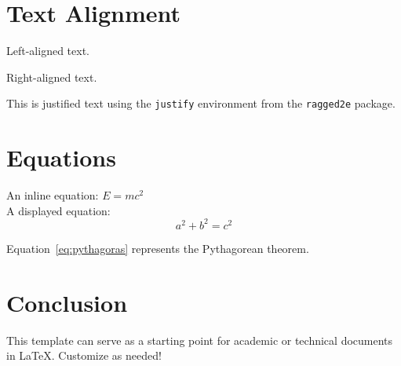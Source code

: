 \documentclass[12pt]{article} %
\begin{document}
\section{Text Alignment}
\begin{flushleft}
Left-aligned text.
\end{flushleft}

\begin{flushright}
Right-aligned text.
\end{flushright}

\begin{justify}
This is justified text using the \texttt{justify} environment from the \texttt{ragged2e} package.
\end{justify}

\section{Equations}
An inline equation: $E = mc^2$ \\
A displayed equation:
\begin{equation}
    a^2 + b^2 = c^2
    \label{eq:pythagoras}
\end{equation}

Equation~\ref{eq:pythagoras} represents the Pythagorean theorem.

\section{Conclusion}
\justifying
This template can serve as a starting point for academic or technical documents in LaTeX. Customize as needed!

\end{document}
